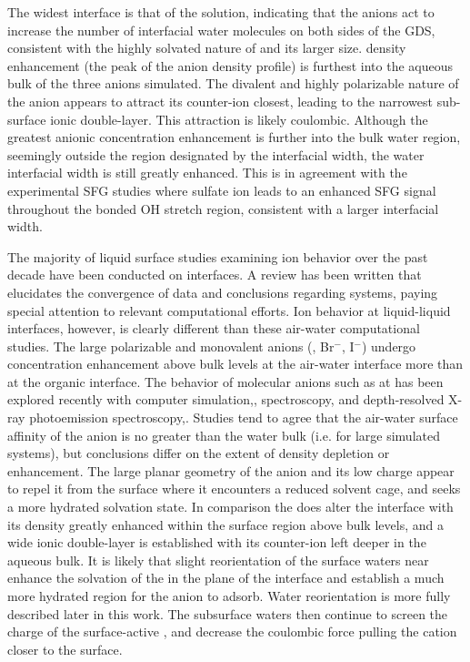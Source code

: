 The widest interface is that of the \sodsul solution, indicating that the \sul anions act to increase the number of interfacial water molecules on both sides of the GDS, consistent with the highly solvated nature of \sul and its larger size. \sul density enhancement (the peak of the anion density profile) is furthest into the aqueous bulk of the three anions simulated. The divalent and highly polarizable nature of the \sul anion appears to attract its counter-ion closest, leading to the narrowest sub-surface ionic double-layer. This attraction is likely coulombic. Although the greatest anionic concentration enhancement is further into the bulk water region, seemingly outside the region designated by the interfacial width, the water interfacial width is still greatly enhanced. This is in agreement with the experimental \sodsul SFG studies where sulfate ion leads to an enhanced SFG signal throughout the bonded OH stretch region, consistent with a larger interfacial width.\cite{McFearin2009}

The majority of liquid surface studies examining ion behavior over the past decade have been conducted on \airwat interfaces. A review has been written that elucidates the convergence of data and conclusions regarding \airwat systems, paying special attention to relevant computational efforts.\cite{Jungwirth2006} Ion behavior at liquid-liquid interfaces, however, is clearly different than these air-water computational studies. The large polarizable and monovalent anions (\cl, Br$^-$, I$^-$) undergo concentration enhancement above bulk levels at the air-water interface more than at the organic interface.\cite{Wick2006c,Wick2007a} The behavior of molecular anions such as \nit at \airwat has been explored recently with computer simulation,\cite{Thomas2007,Miller2009}, spectroscopy,\cite{Soule2007,Xu2009,Otten2007} and depth-resolved X-ray photoemission spectroscopy,\cite{Brown2009}. Studies tend to agree that the air-water surface affinity of the \nit anion is no greater than the water bulk (i.e. for large simulated systems), but conclusions differ on the extent of density depletion or enhancement. The large planar geometry of the \nit anion and its low charge appear to repel it from the \airwat surface where it encounters a reduced solvent cage, and seeks a more hydrated solvation state. In comparison the \nit does alter the \ctcwat interface with its density greatly enhanced within the surface region above bulk levels, and a wide ionic double-layer is established with its counter-ion left deeper in the aqueous bulk. It is likely that slight reorientation of the surface waters near \ctc enhance the solvation of the \nit in the plane of the interface and establish a much more hydrated region for the anion to adsorb. Water reorientation is more fully described later in this work. The subsurface waters then continue to screen the charge of the surface-active \nit, and decrease the coulombic force pulling the cation closer to the surface. 

